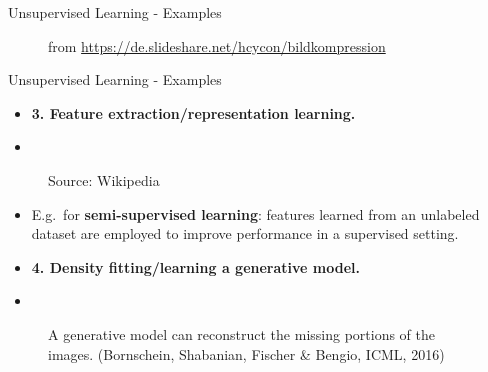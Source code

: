 \begin{vbframe}{Unsupervised Learning - Examples}
    \begin{figure}
        \caption{from \url{https://de.slideshare.net/hcycon/bildkompression}}
    \end{figure}

\end{vbframe}



\begin{vbframe} {Unsupervised Learning - Examples}
  \begin{itemize}
    \item[] \textbf{3. Feature extraction/representation learning.}
    \item[]
  \end{itemize}
   \begin{figure}
        \caption{Source: Wikipedia}
    \end{figure}
    \begin{itemize}
    \item  E.g.~for \textbf{semi-supervised learning}: features learned from an unlabeled dataset are employed to improve performance in a supervised setting. 
    \end{itemize}
\framebreak
  \begin{itemize}
    \item[] \textbf{4. Density fitting/learning a generative model.}
    \item[]
  \end{itemize}
   \begin{figure}
        \caption{A generative model can reconstruct the missing portions of the images. (Bornschein, Shabanian, Fischer \& Bengio, ICML, 2016)}
    \end{figure}
    


\end{vbframe}
